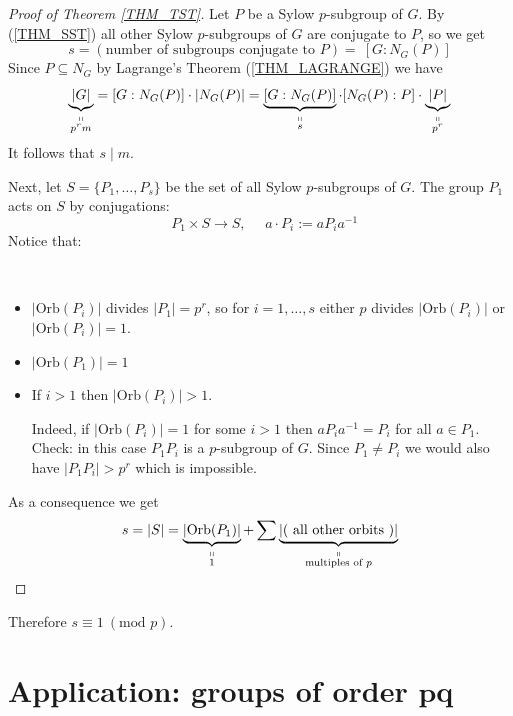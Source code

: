 \documentclass[12pt, letterpaper, oneside]{article}
\theoremstyle{plain}
\theoremstyle{definition}
\newcommand{\Orb}{\mathrm{Orb}}
\newcommand{\bit}{\begin{itemize}}
\newcommand{\eit}{\end{itemize}}
\begin{document}
\begin{proof}[Proof of Theorem \ref{THM_TST}]
Let $P$ be a Sylow $p$-subgroup of $G$. By (\ref{THM_SST}) all other 
Sylow $p$-subgroups of $G$ are conjugate to $P$, so we get 
$$s = (\text{number of subgroups conjugate to $P$}) = \ [G: N_{G}(P)]$$ 
Since $P\subseteq N_{G}$ by Lagrange's Theorem (\ref{THM_LAGRANGE})
we have
$$\underbrace{|G|}_{\substack{ \shortparallel  \\ p^{r}m}} = [G: N_{G}(P)]\cdot |N_{G}(P)| = 
\underbrace{[G: N_{G}(P)]}_{\substack{ \shortparallel  \\ s}}\cdot 
[N_{G}(P) : P ]\cdot \underbrace{|P|}_{\substack{ \shortparallel  \\ p^{r}}}$$
It follows that  $s\mid m$.

Next, let $S = \{P_{1}, \dots, P_{s} \}$ be the set of all Sylow $p$-subgroups of $G$. 
The group $P_{1}$ acts on $S$ by conjugations:
$$\ \ \ P_{1}\times S \to S, \ \ \ \ \ \  a\cdot P_{i} := aP_{i}a^{-1}$$
Notice that:
\vskip -13mm

\ 
\bit
\item  $|\Orb(P_{i})|$ divides $|P_{1}|=p^{r}$,  so for $i=1, \dots, s$ either $p$ divides 
$|\Orb(P_{i})|$ or $|\Orb(P_{i})|=1$.
\item $|\Orb(P_{1})| =1$
\item If $i>1$ then $|\Orb(P_{i})| >1$.

Indeed, if $|\Orb(P_{i})| = 1$ for some $i>1$ then $aP_{i}a^{-1} = P_{i}$
for all $a\in P_{1}$. Check: in this case $P_{1}P_{i}$ is a $p$-subgroup of $G$. 
Since $P_{1}\neq P_{i}$ we would also have $|P_{1}P_{i}| > p^{r}$ which is impossible. 
\eit

As a consequence we get 
$$s = |S| = \underbrace{|\Orb(P_{1})|}_{\substack{\shortparallel \\ 1}} + 
\sum \underbrace{|(\text{ all other orbits } )|}_{\substack{\shortparallel \\ \text{multiples of $p$}}}$$
\end{proof}
Therefore $s \equiv 1 \ (\textrm{mod } p)$.









\newpage
\section{Application: groups of order $\mathbf{pq}$}
\label{SEC_GPSPQ}
\end{document}
